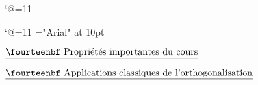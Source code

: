 \catcode`@=11\relax
\def\Api{Mathematicon@Api}%





\catcode`@=11\relax
\font\LD@Font@Arial="Arial" at 10pt
\newcount\LD@Count@Temp
\def\LD@Exercice@Display@Code{}%
\def\LD@Exercice@Display@Code@Post{%
	\ifcsname LD@Exo@@Solution\endcsname
		\unless\ifx\LD@Exo@@Solution\LD@Empty
			\pn{\eightpts Solution : \eightpts \LD@Exo@@Solution}%
		\fi
	\fi
}%
\def\LD@Display#1{%
	\LD@Count@Temp=#1\relax
	\ifcase\LD@Count@Temp
	\or
	Math. Sup.
	\or
	Math. Sp\'e
	\else
	\fi
}%
\newcount\LD@Exo@Total{}\relax
\def\LD@Exo@Theme@Display#1#2#3{%
	{\LD@Loop@For\LD@Theme=#2\WithSeparator\Do{%
		\goodbreak\bigskip
		\centerline{\LD@Font@Arial \LD@Theme}%
		\medskip
		{\LD@Loop@For\LD@Exo@Type=#3\WithSeparator ,\Do{%
			\ifcsname LD@Exo@Theme@@#1@@\LD@Theme @@\LD@Exo@Type\endcsname
				\EA\let\EA\LD@Exo@List\CS LD@Exo@Theme@@#1@@\LD@Theme @@\LD@Exo@Type\EC
				{\LD@Loop@For\LD@Exo@Label=\LD@Exo@List\WithSeparator ,\Do{%
					\llap{\LD@Exo@Label\qquad}\EA\Exercice\EA{\LD@Exo@Label}\medskip\noindent
					\global\advance\LD@Exo@Total by1\relax
				}}%
			\fi
		}}%
	}}%

}%
\vglue-10mm%
\bigskip

\centerline{$\underline{\hbox{\fourteenbf Propri\'et\'es importantes du cours}}$}%
\bigskip


%
\bigskip

%
\bigskip

\centerline{$\underline{\hbox{\fourteenbf Applications classiques de l'orthogonalisation}}$}%
\bigskip


%
\bigskip

%
\bigskip

%
\bigskip

%
\bigskip
\bye
